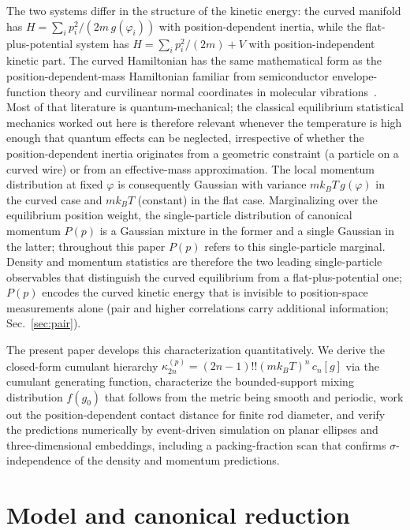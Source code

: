 \documentclass[aps,pre,twocolumn,superscriptaddress,longbibliography,floatfix]{revtex4-2}
\begin{document}
The two systems differ in the structure of the kinetic energy:
the curved manifold has $H=\sum_i p_i^2/(2m\,g(\varphi_i))$ with position-dependent inertia,
while the flat-plus-potential system has $H=\sum_i p_i^2/(2m)+V$ with position-independent
kinetic part.
The curved Hamiltonian has the same mathematical form as the position-dependent-mass
Hamiltonian familiar from semiconductor envelope-function theory and curvilinear normal
coordinates in molecular vibrations~\cite{BenDanielDuke1966,vonRoos1983}.
Most of that literature is quantum-mechanical; the classical equilibrium statistical
mechanics worked out here is therefore relevant whenever the temperature is high enough
that quantum effects can be neglected, irrespective of whether the position-dependent
inertia originates from a geometric constraint (a particle on a curved wire) or from
an effective-mass approximation.
The local momentum distribution at fixed $\varphi$ is consequently Gaussian with variance
$mk_BT\,g(\varphi)$ in the curved case and $mk_BT$ (constant) in the flat case.
Marginalizing over the equilibrium position weight, the single-particle distribution of
canonical momentum $P(p)$ is a Gaussian mixture in the former and a single Gaussian in the
latter; throughout this paper $P(p)$ refers to this single-particle marginal.
Density and momentum statistics are therefore the two leading single-particle observables
that distinguish the curved equilibrium from a flat-plus-potential one;
$P(p)$ encodes the curved kinetic energy that is invisible to position-space measurements
alone (pair and higher correlations carry additional information; Sec.~\ref{sec:pair}).

The present paper develops this characterization quantitatively.
We derive the closed-form cumulant hierarchy
$\kappa_{2n}^{(p)}=(2n-1)!!(mk_BT)^n\,c_n[g]$ via the cumulant generating function,
characterize the bounded-support mixing distribution $f(g_0)$ that follows from the metric
being smooth and periodic, work out the position-dependent contact distance for finite rod
diameter, and verify the predictions numerically by event-driven simulation on planar
ellipses and three-dimensional embeddings, including a packing-fraction scan that confirms
$\sigma$-independence of the density and momentum predictions.

\section{Model and canonical reduction}
\label{sec:model}
\end{document}
